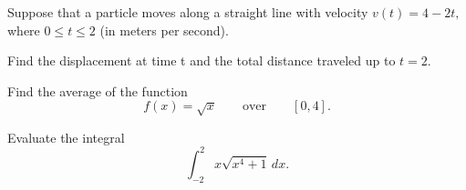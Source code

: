 \begin{exercise}

Suppose that a particle moves along a straight line with velocity
\(v(t)=4-2t,\) where \(0\leq t\leq 2\) (in meters per second).

Find the displacement at time t and the total distance traveled up to
\(t=2\).

\end{exercise}
\vspace*{6\baselineskip}


\begin{exercise}

Find the average of the function
\[f(x)=\sqrt{x}\qquad\text{over}\qquad [0,4].\]

\end{exercise}
\vspace*{6\baselineskip}


\begin{exercise}

Evaluate the integral \[\int_{-2}^2 x\sqrt{x^4+1}\,dx.\]

\end{exercise}

